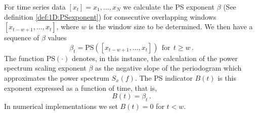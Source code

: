 {\begin{definition} 
	\label{def:1D:indicator:PS}
	For time series data $[x_t] = x_1, ..., x_N$ we calculate the PS exponent $\beta$ (See definition \ref{def:1D:PSexponent}) for consecutive overlapping windows $[x_{t-w+1},...,x_t]$, where $w$ is the window size to be determined. We then have a sequence of $\beta$ values
	\begin{equation}
	\label{eqn:1D:PSindicator:exponent_beta}
		\beta_t = \text{PS}([x_{t-w+1},...,x_t]) ~~\text{for}~~t\geq w\,.
	\end{equation}
	The function $\text{PS}(\cdot)$ denotes, in this instance, the calculation of the power spectrum scaling exponent $\beta$ as the negative slope of the periodogram which approximates the power spectrum $S_x(f)$. The PS indicator $B(t)$ is this exponent expressed as a function of time, that is,
	\begin{equation}
		\label{eqn:1D:PSfingerprinting}
		B(t) = \beta_t\,.
	\end{equation}
	In numerical implementations we set $B(t)=0$ for $t<w$.
\end{definition}

{\Red{
		
}}}
